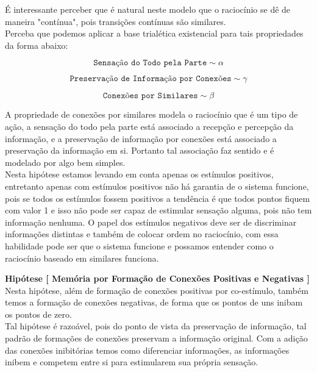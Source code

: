 \documentclass[10pt,a4paper]{report}
\begin{document}
É interessante perceber que é natural neste modelo que o raciocínio se dê de maneira "contínua", pois transições contínuas são similares. \\

Perceba que podemos aplicar a base trialética existencial para tais propriedades da forma abaixo:

$$ \texttt{Sensação do Todo pela Parte} \sim \alpha $$

$$ \texttt{Preservação de Informação por Conexões} \sim \gamma $$

$$ \texttt{Conexões por Similares} \sim \beta $$

A propriedade de conexões por similares modela o raciocínio que é um tipo de ação, a sensação do todo pela parte está associado a recepção e percepção da informação, e a preservação de informação por conexões está associado a preservação da informação em si. Portanto tal associação faz sentido e é modelado por algo bem simples.\\

Nesta hipótese estamos levando em conta apenas os estímulos positivos, entretanto apenas com estímulos positivos não há garantia de o sistema funcione, pois se todos os estímulos fossem positivos a tendência é que todos pontos fiquem com valor 1 e isso não pode ser capaz de estimular sensação alguma, pois não tem informação nenhuma. O papel dos estímulos negativos deve ser de discriminar informações distintas e também de colocar ordem no raciocínio, com essa habilidade pode ser que o sistema funcione e possamos entender como o raciocínio baseado em similares funciona.

\hspace{\baselineskip}

\textbf{Hipótese [ Memória por Formação de Conexões Positivas e Negativas ]} Nesta hipótese, além de formação de conexões positivas por co-estímulo, também temos a formação de conexões negativas, de forma que os pontos de uns inibam os pontos de zero.\\

Tal hipótese é razoável, pois do ponto de vista da preservação de informação, tal padrão de formações de conexões preservam a informação original. Com a adição das conexões inibitórias temos como diferenciar informações, as informações inibem e competem entre si para estimularem sua própria sensação.
\end{document}
